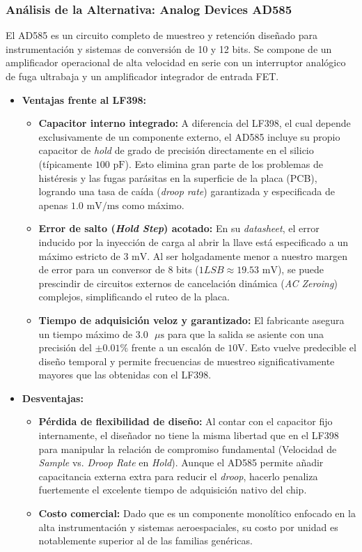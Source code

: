 \subsubsection*{Análisis de la Alternativa: Analog Devices AD585}

El AD585 es un circuito completo de muestreo y retención diseñado para instrumentación y sistemas de conversión de 10 y 12 bits. Se compone de un amplificador operacional de alta velocidad en serie con un interruptor analógico de fuga ultrabaja y un amplificador integrador de entrada FET.

\begin{itemize}
	\item \textbf{Ventajas frente al LF398:}
	\begin{itemize}
		\item \textbf{Capacitor interno integrado:} A diferencia del LF398, el cual depende exclusivamente de un componente externo, el AD585 incluye su propio capacitor de \textit{hold} de grado de precisión directamente en el silicio (típicamente $100\text{ pF}$). Esto elimina gran parte de los problemas de histéresis y las fugas parásitas en la superficie de la placa (PCB), logrando una tasa de caída (\textit{droop rate}) garantizada y especificada de apenas $1.0\text{ mV/ms}$ como máximo.
		\item \textbf{Error de salto (\textit{Hold Step}) acotado:} En su \textit{datasheet}, el error inducido por la inyección de carga al abrir la llave está especificado a un máximo estricto de $3\text{ mV}$. Al ser holgadamente menor a nuestro margen de error para un conversor de 8 bits ($1 LSB \approx 19.53\text{ mV}$), se puede prescindir de circuitos externos de cancelación dinámica (\textit{AC Zeroing}) complejos, simplificando el ruteo de la placa.
		\item \textbf{Tiempo de adquisición veloz y garantizado:} El fabricante asegura un tiempo máximo de $3.0\text{ }\mu\text{s}$ para que la salida se asiente con una precisión del $\pm 0.01\%$ frente a un escalón de $10\text{V}$. Esto vuelve predecible el diseño temporal y permite frecuencias de muestreo significativamente mayores que las obtenidas con el LF398.
	\end{itemize}
	
	\item \textbf{Desventajas:}
	\begin{itemize}
		\item \textbf{Pérdida de flexibilidad de diseño:} Al contar con el capacitor fijo internamente, el diseñador no tiene la misma libertad que en el LF398 para manipular la relación de compromiso fundamental (Velocidad de \textit{Sample} vs. \textit{Droop Rate} en \textit{Hold}). Aunque el AD585 permite añadir capacitancia externa extra para reducir el \textit{droop}, hacerlo penaliza fuertemente el excelente tiempo de adquisición nativo del chip.
		\item \textbf{Costo comercial:} Dado que es un componente monolítico enfocado en la alta instrumentación y sistemas aeroespaciales, su costo por unidad es notablemente superior al de las familias genéricas.
	\end{itemize}
\end{itemize}